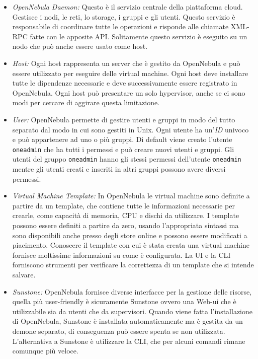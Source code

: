 \begin{itemize}
    \item \emph{OpenNebula Daemon:} Questo è il servizio centrale della piattaforma cloud. Gestisce i nodi, le reti, lo storage, i gruppi e gli utenti. Questo servizio è responsabile di coordinare tutte le operazioni e risponde alle chiamate XML-RPC fatte con le apposite API. Solitamente questo servizio è eseguito su un nodo che può anche essere usato come host.
    \item \emph{Host:} Ogni host rappresenta un server che è gestito da OpenNebula e può essere utilizzato per eseguire delle virtual machine. Ogni host deve installare tutte le dipendenze necessarie e deve successivamente essere registrato in OpenNebula. Ogni host può presentare un solo hypervisor, anche se ci sono modi per cercare di aggirare questa limitazione.
    \item  \emph{User:} OpenNebula permette di gestire utenti e gruppi in modo del tutto separato dal modo in cui sono gestiti in Unix. Ogni utente ha un'\emph{ID} univoco e può appartenere ad uno o più gruppi. Di default viene creato l'utente \texttt{oneadmin} che ha tutti i permessi e può creare nuovi utenti e gruppi. Gli utenti del gruppo \texttt{oneadmin} hanno gli stessi permessi dell'utente \texttt{oneadmin} mentre gli utenti creati e inseriti in altri gruppi possono avere diversi permessi.
    \item \emph{Virtual Machine Template:} In OpenNebula le virtual machine sono definite a partire da un template, che contiene tutte le informazioni necessarie per crearle, come capacità di memoria, CPU e dischi da utilizzare. I template possono essere definiti a partire da zero, usando l'appropriata sintassi ma sono disponibili anche presso degli store online e possono essere modificati a piacimento. Conoscere il template con cui è stata creata una virtual machine fornisce moltissime informazioni su come è configurata. La UI e la CLI forniscono strumenti per verificare la correttezza di un template che si intende salvare.
    \item \emph{Sunstone:} OpenNebula fornisce diverse interfacce per la gestione delle risorse, quella più user-friendly è sicuramente Sunstone ovvero una Web-ui che è utilizzabile sia da utenti che da supervisori. Quando viene fatta l'installazione di OpenNebula, Sunstone è installata automaticamente ma è gestita da un demone separato, di conseguenza può essere spenta se non utilizzata. L'alternativa a Sunstone è utilizzare la CLI, che per alcuni comandi rimane comunque più veloce.
\end{itemize}
